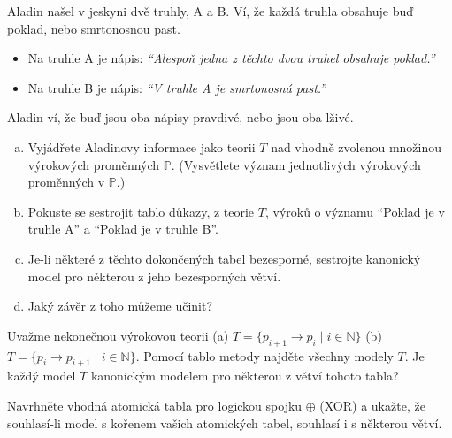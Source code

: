 \documentclass[a4paper,11pt]{amsart}
\begin{document}
\begin{problem}
    
    Aladin našel v jeskyni dvě truhly, A a B. Ví, že každá truhla obsahuje buď poklad, nebo smrtonosnou past.
    \begin{itemize}
    \item Na truhle A je nápis: {\it ``Alespoň jedna z těchto dvou truhel obsahuje poklad.''}
    \item Na truhle B je nápis: {\it ``V truhle A je smrtonosná past.''}
    \end{itemize}
    Aladin ví, že buď jsou oba nápisy pravdivé, nebo jsou oba lživé.
    \begin{enumerate}[(a)]
        \item Vyjádřete Aladinovy informace jako teorii $T$ nad vhodně zvolenou množinou výrokových proměnných $\mathbb P$. (Vysvětlete význam jednotlivých výrokových proměnných v $\mathbb P$.)
        \item Pokuste se sestrojit tablo důkazy, z teorie $T$, výroků o významu ``Poklad je v truhle A'' a ``Poklad je v truhle B''.
        \item Je-li některé z těchto dokončených tabel bezesporné, sestrojte kanonický model pro některou z jeho bezesporných větví.
        \item Jaký závěr z toho můžeme učinit?
    \end{enumerate}

    \begin{solution}
                    
    \end{solution}

\end{problem}


\begin{problem}

    Uvažme nekonečnou výrokovou teorii (a) $T=\{p_{i+1} \to p_i\mid i\in \mathbb{N}\}$ (b) $T=\{p_i \to p_{i+1}\mid i\in \mathbb{N}\}$. Pomocí tablo metody najděte všechny modely $T$. Je každý model $T$ kanonickým modelem pro některou z větví tohoto tabla? %

    \begin{solution}
                    
    \end{solution}

\end{problem}


\begin{problem}

    Navrhněte vhodná atomická tabla pro logickou spojku $\oplus$ (XOR) a ukažte, že souhlasí-li model s kořenem vašich atomických tabel, souhlasí i s některou větví.

    \begin{solution}
                    
    \end{solution}
        
\end{problem}
\end{document}
